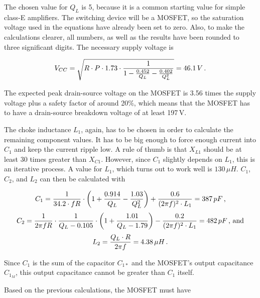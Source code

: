 The chosen value for \(Q_L\) is 5, because it is a common starting value for simple class-E amplifiers. The switching device will be a MOSFET, so the saturation voltage used in the equations have already been set to zero. Also, to make the calculations clearer, all numbers, as well as the results have been rounded to three significant digits. The necessary supply voltage is

\begin{equation*}
    V_{CC} = \sqrt{R \cdot P \cdot 1.73 \cdot \frac{1}{1 - \frac{0.452}{Q_L} - \frac{0.402}{Q_L^2}}} = 46.1\,V\textnormal{\,.}
\end{equation*}

The expected peak drain-source voltage on the MOSFET is 3.56 times the supply voltage plus a safety factor of around 20\%, which means that the MOSFET has to have a drain-source breakdown voltage of at least 197\,V. 

The choke inductance \(L_1\), again, has to be chosen in order to calculate the remaining component values. It has to be big enough to force enough current into \(C_1\) and keep the current ripple low. A rule of thumb is that \(X_{L1}\) should be at least 30 times greater than \(X_{C1}\). However, since \(C_1\) slightly depends on \(L_1\), this is an iterative process. A value for \(L_1\), which turns out to work well is \(130\,\mu H\). \(C_1\), \(C_2\), and \(L_2\) can then be calculated with

\begin{equation*}
    C_1 = \frac{1}{34.2\cdot f R} \cdot \left( 1 + \frac{0.914}{Q_L} - \frac{1.03}{Q_L^2} \right) + \frac{0.6}{(2 \pi f)^2  \cdot L_1} = 387\,pF\textnormal{\,,}
\end{equation*}
\begin{equation*}
    C_2 = \frac{1}{2 \pi  f  R} \cdot \frac{1}{Q_L - 0.105} \cdot \left( 1 + \frac{1.01}{Q_L - 1.79} \right) - \frac{0.2}{(2 \pi f)^2 \cdot L_1} = 482\,pF \textnormal{\,, and}
\end{equation*}
\begin{equation*}
    L_2 = \frac{Q_L \cdot R}{2 \pi f} = 4.38\,\mu H\textnormal{\,.}
\end{equation*}
 
Since \(C_1\) is the sum of the capacitor \(C_{1*}\) and the MOSFET's output capacitance \(C_{1_M}\), %
this output capacitance cannot be greater than \(C_1\) itself.

Based on the previous calculations, the MOSFET must have

